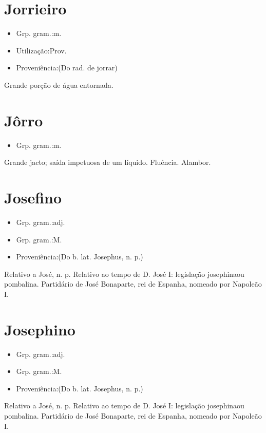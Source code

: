 \documentclass{article}
\begin{document}
\section{Jorrieiro}
\begin{itemize}
\item {Grp. gram.:m.}
\end{itemize}
\begin{itemize}
\item {Utilização:Prov.}
\end{itemize}
\begin{itemize}
\item {Proveniência:(Do rad. de \textunderscore jorrar\textunderscore )}
\end{itemize}
Grande porção de água entornada.
\section{Jôrro}
\begin{itemize}
\item {Grp. gram.:m.}
\end{itemize}
Grande jacto; saída impetuosa de um líquido.
Fluência.
Alambor.
\section{Josefino}
\begin{itemize}
\item {Grp. gram.:adj.}
\end{itemize}
\begin{itemize}
\item {Grp. gram.:M.}
\end{itemize}
\begin{itemize}
\item {Proveniência:(Do b. lat. \textunderscore Josephus\textunderscore , n. p.)}
\end{itemize}
Relativo a José, n. p.
Relativo ao tempo de D. José I: \textunderscore legislação josephina\textunderscore  ou \textunderscore pombalina\textunderscore .
Partidário de José Bonaparte, rei de Espanha, nomeado por Napoleão I.
\section{Josephino}
\begin{itemize}
\item {Grp. gram.:adj.}
\end{itemize}
\begin{itemize}
\item {Grp. gram.:M.}
\end{itemize}
\begin{itemize}
\item {Proveniência:(Do b. lat. \textunderscore Josephus\textunderscore , n. p.)}
\end{itemize}
Relativo a José, n. p.
Relativo ao tempo de D. José I: \textunderscore legislação josephina\textunderscore  ou \textunderscore pombalina\textunderscore .
Partidário de José Bonaparte, rei de Espanha, nomeado por Napoleão I.
\end{document}
